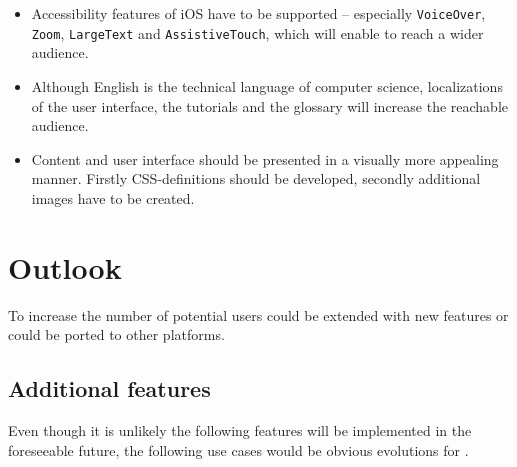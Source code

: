 \begin{itemize}

\item Accessibility features of iOS have to be supported – especially 
\verb+VoiceOver+, \verb+Zoom+, \verb+LargeText+ and \verb+AssistiveTouch+,
which will enable \Nyaya to reach a wider audience.

\item Although English is the technical language of computer science,
localizations of the user interface, the tutorials and the glossary will increase 
the reachable audience.
%
%


\item Content and user interface should be presented in a visually more appealing manner.
Firstly CSS-definitions should be developed, secondly additional images have to be created.

\end{itemize}
%
%
%
%
%

\section{Outlook}

To increase the number of potential users
\Nyaya could be extended with new features
or \Nyaya could be ported to other platforms.

\subsection{Additional features}

Even though it is unlikely the following features will be implemented in the foreseeable future, 
the following use cases would be obvious evolutions for \Nyaya.

